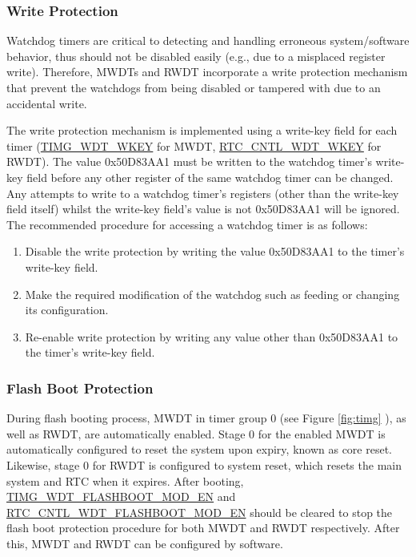 \documentclass[main\_\_EN.tex]{subfiles}
\begin{document}
\subsubsection{Write Protection}
Watchdog timers are critical to detecting and handling erroneous system/software behavior, thus should not be disabled easily (e.g., due to a misplaced register write). Therefore, MWDTs and RWDT incorporate a write protection mechanism that prevent the watchdogs from being disabled or tampered with due to an accidental write.

The write protection mechanism is implemented using a write-key field for each timer (\hyperref[fielddesc:TIMGWDTWKEY]{TIMG\_WDT\_WKEY} for  MWDT, \hyperref[fielddesc:RTCCNTLWDTWKEY]{RTC\_CNTL\_WDT\_WKEY} for RWDT). The value 0x{}50D83AA1 must be written to the watchdog timer's write-key field before any other register of the same watchdog timer can be changed. Any attempts to write to a watchdog timer's registers (other than the write-key field itself) whilst the write-key field's value is not 0x{}50D83AA1 will be ignored. The recommended procedure for accessing a watchdog timer is as follows:
\begin{enumerate}
\item Disable the write protection by writing the value 0x{}50D83AA1 to the timer's write-key field.
\item Make the required modification of the watchdog such as feeding or changing its configuration.
\item Re-enable write protection by writing any value other than 0x{}50D83AA1 to the timer's write-key field.
\end{enumerate}

\subsubsection{Flash Boot Protection}
During flash booting process, MWDT in timer group 0 (see Figure \ref{fig:timg} \textit{}), as well as RWDT, are automatically enabled. Stage 0 for the enabled MWDT is automatically configured to reset the system upon expiry, known as core reset. Likewise, stage 0 for RWDT is configured to system reset, which resets the main system and RTC when it expires. After booting, \hyperref[fielddesc:TIMGWDTFLASHBOOTMODEN]{TIMG\_WDT\_FLASHBOOT\_MOD\_EN} and \hyperref[fielddesc:RTCCNTLWDTFLASHBOOTMODEN]{RTC\_CNTL\_WDT\_FLASHBOOT\_MOD\_EN}  should be cleared to stop the flash boot protection procedure for both MWDT and RWDT respectively. After this, MWDT and RWDT can be configured by software.
\end{document}
